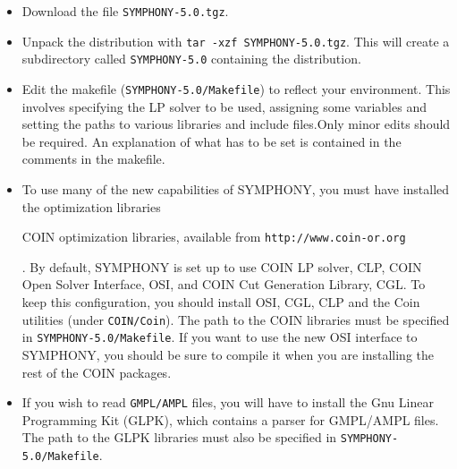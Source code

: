 \begin{itemize}

        \item Download the file {\tt SYMPHONY-5.0.tgz}.

        \item Unpack the distribution with {\tt tar -xzf
        SYMPHONY-5.0.tgz}. This will create a subdirectory called
        {\tt SYMPHONY-5.0} containing the distribution.
        
        \item Edit the makefile ({\tt SYMPHONY-5.0/Makefile}) to reflect your
              environment. This involves specifying the LP solver to be used,
              assigning some variables and setting the paths to various 
              libraries and include files.Only minor
              edits should be required. An explanation of what has to be set
              is contained in the comments in the makefile. 

        \item To use many of the new capabilities of SYMPHONY, you must have
	      installed the
	      optimization libraries \begin{latexonly} COIN optimization
	      libraries, available from \texttt{http://www.coin-or.org}
	      \end{latexonly}.  By default, SYMPHONY is 
	      set up to use COIN LP solver, CLP, COIN Open Solver Interface, 
	      OSI, and COIN Cut Generation Library, CGL. To keep this 
	      configuration, you should install OSI, CGL, CLP and the Coin 
	      utilities (under \texttt{COIN/Coin}). The path to 
	      the COIN libraries must be specified in 
	      \texttt{SYMPHONY-5.0/Makefile}.  If you want to use the new OSI 
              interface to SYMPHONY, you should be sure to compile it when you 
              are installing the rest of the COIN packages.

        \item If you wish to read \texttt{GMPL/AMPL} files, you will have to 
              install
	      the Gnu Linear Programming Kit (GLPK), which contains a parser
	      for GMPL/AMPL files. The path to the GLPK libraries must also be
	      specified in \texttt{SYMPHONY-5.0/Makefile}.


\end{itemize}
